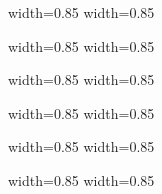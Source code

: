 \begin{frame}
      {width=0.85\textwidth} {}
      {width=0.85\textwidth} {}
\end{frame}
\begin{frame}
      {width=0.85\textwidth} {}
      {width=0.85\textwidth} {}
\end{frame}
\begin{frame}
      {width=0.85\textwidth} {}
      {width=0.85\textwidth} {}
\end{frame}
\begin{frame}
      {width=0.85\textwidth} {}
      {width=0.85\textwidth} {}
\end{frame}
\begin{frame}
      {width=0.85\textwidth} {}
      {width=0.85\textwidth} {}
\end{frame}

\begin{frame}
      {width=0.85\textwidth} {}
      {width=0.85\textwidth} {}
\end{frame}

